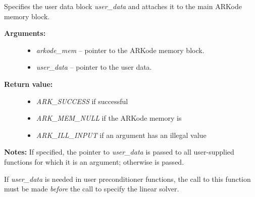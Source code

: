 \documentclass[letterpaper,10pt,english]{sphinxmanual}
\begin{document}
\begin{fulllineitems}
\label{c_interface/User_callable:c.ARKodeSetUserData}
Specifies the user data block \emph{user\_data} and
attaches it to the main ARKode memory block.
\begin{description}
\item[{\textbf{Arguments:}}] \leavevmode\begin{itemize}
\item {} 
\emph{arkode\_mem} -- pointer to the ARKode memory block.

\item {} 
\emph{user\_data} -- pointer to the user data.

\end{itemize}

\item[{\textbf{Return value:}}] \leavevmode\begin{itemize}
\item {} 
\emph{ARK\_SUCCESS} if successful

\item {} 
\emph{ARK\_MEM\_NULL} if the ARKode memory is 

\item {} 
\emph{ARK\_ILL\_INPUT} if an argument has an illegal value

\end{itemize}

\end{description}

\textbf{Notes:} If specified, the pointer to \emph{user\_data} is passed to all
user-supplied functions for which it is an argument; otherwise
 is passed.

If \emph{user\_data} is needed in user preconditioner functions, the
call to this function must be made \emph{before} the call to
specify the linear solver.

\end{fulllineitems}
\end{document}

